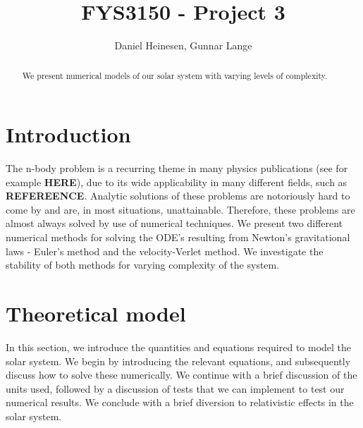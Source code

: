 \documentclass[a4paper, 10pt]{article}
\title{FYS3150 - Project 3}
\author{Daniel Heinesen, Gunnar Lange}
\begin{document}
\maketitle
\begin{abstract}
We present numerical models of our solar system with varying levels of complexity.
\end{abstract}

\tableofcontents
\newpage
\section{Introduction}
The n-body problem is a recurring theme in many physics publications (see for example \textbf{HERE}), due to its wide applicability in many different fields, such as \textbf{REFEREENCE}.  Analytic solutions of these problems are notoriously hard to come by and are, in most situations, unattainable. Therefore, these problems are almost always solved by use of numerical techniques. We present two different numerical methods for solving the ODE's resulting from Newton's gravitational laws - Euler's method and the velocity-Verlet method. We investigate the stability of both methods for varying complexity of the system.
\section{Theoretical model}\label{Theoretical_section}
In this section, we introduce the quantities and equations required to model the solar system. We begin by introducing the relevant equations, and subsequently discuss how to solve these numerically. We continue with a brief discussion of the units used, followed by a discussion of tests that we can implement to test our numerical results. We conclude with a brief diversion to relativistic effects in the solar system.
\end{document}

